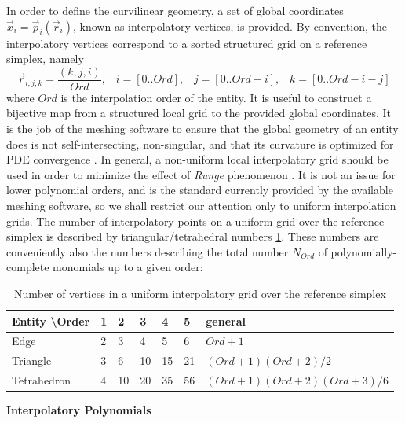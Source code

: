\noindent
In order to define the curvilinear geometry, a set of global coordinates $\vec{x}_i = \vec{p}_i(\vec{r}_i)$, known as interpolatory vertices, is provided. By convention, the interpolatory vertices correspond to a sorted structured grid on a reference simplex, namely
\[\vec{r}_{i,j,k} = \frac{(k,j,i)}{Ord}, \;\;\; i=[0..Ord], \;\;\; j=[0..Ord-i], \;\;\; k=[0..Ord-i-j]\]
where $Ord$ is the interpolation order of the entity. It is useful to construct a bijective map from a structured local grid to the provided global coordinates. It is the job of the meshing software to ensure that the global geometry of an entity does is not self-intersecting, non-singular, and that its curvature is optimized for PDE convergence \cite{lenoir1986}. In general, a non-uniform local interpolatory grid should be used in order to minimize the effect of \textit{Runge} phenomenon \cite{runge1901}. It is not an issue for lower polynomial orders, and is the standard currently provided by the available meshing software, so we shall restrict our attention only to uniform interpolation grids. The number of interpolatory points on a uniform grid over the reference simplex is described by triangular/tetrahedral numbers \cref{table:lagrange:nvertex}. These numbers are conveniently also the numbers describing the total number $N_{Ord}$ of polynomially-complete monomials up to a given order:
%
\begin{table}[H]
\centering
\begin{tabular}{l l l l l l l}
\hline
  Entity \textbackslash Order & 1 & 2  & 3  & 4  & 5 & general \\ \hline
  Edge                        & 2 & 3  & 4  & 5  & 6 & $Ord+1$\\
  Triangle                    & 3 & 6  & 10 & 15 & 21 & $(Ord+1)(Ord+2)/2$\\
  Tetrahedron                 & 4 & 10 & 20 & 35 & 56 & $(Ord+1)(Ord+2)(Ord+3)/6$
\end{tabular}
\caption{Number of vertices in a uniform interpolatory grid over the reference simplex}
\label{table:lagrange:nvertex}
\end{table}





\noindent
\textbf{Interpolatory Polynomials}

